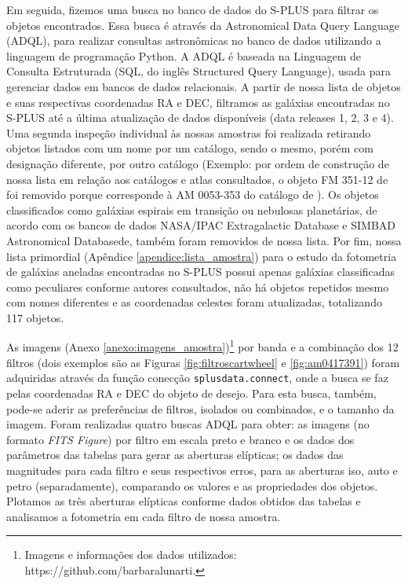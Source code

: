 Em seguida, fizemos uma busca no banco de dados do S-PLUS para filtrar os objetos encontrados. Essa busca é através da Astronomical Data Query Language (ADQL), para realizar consultas astronômicas no banco de dados utilizando a linguagem de programação Python. A ADQL é baseada na Linguagem de Consulta Estruturada (SQL, do inglês Structured Query Language), usada para gerenciar dados em bancos de dados relacionais. A partir de nossa lista de objetos e suas respectivas coordenadas RA e DEC, filtramos as galáxias encontradas no S-PLUS até a última atualização de dados disponíveis (data releases 1, 2, 3 e 4). Uma segunda inspeção individual às nossas amostras foi realizada retirando objetos listados com um nome por um catálogo, sendo o mesmo, porém com designação diferente, por outro catálogo (Exemplo: por ordem de construção de nossa lista em relação aos catálogos e atlas consultados, o objeto FM 351-12 de  foi removido porque corresponde à AM 0053-353 do catálogo de ). Os objetos classificados como galáxias espirais em transição ou nebulosas planetárias, de acordo com os bancos de dados NASA/IPAC Extragalactic Database e SIMBAD Astronomical Databasede, também foram removidos de nossa lista. Por fim, nossa lista primordial (Apêndice \ref{apendice:lista_amostra}) para o estudo da fotometria de galáxias aneladas encontradas no S-PLUS possui apenas galáxias classificadas como peculiares conforme autores consultados, não há objetos repetidos mesmo com nomes diferentes e as coordenadas celestes foram atualizadas, totalizando 117 objetos.

As imagens (Anexo \ref{anexo:imagens_amostra})\footnote{Imagens e informações dos dados utilizados: https://github.com/barbaralunarti.} por banda e a combinação dos 12 filtros (dois exemplos são as Figuras \ref{fig:filtroscartwheel} e \ref{fig:am0417391}) foram adquiridas através da função conecção \texttt{splusdata.connect}, onde a busca se faz pelas coordenadas RA e DEC do objeto de desejo. Para esta busca, também, pode-se aderir as preferências de filtros, isolados ou combinados, e o tamanho da imagem. Foram realizadas quatro buscas ADQL para obter: as imagens (no formato \emph{FITS Figure}) por filtro em escala preto e branco e os dados dos parâmetros das tabelas para gerar as aberturas elípticas; os dados das magnitudes para cada filtro e seus respectivos erros, para as aberturas iso, auto e petro (separadamente), comparando os valores e as propriedades dos objetos. Plotamos as três aberturas elípticas conforme dados obtidos das tabelas e analisamos a fotometria em cada filtro de nossa amostra.
